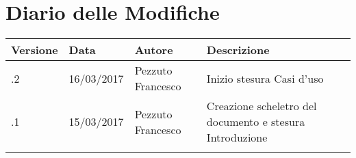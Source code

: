 \section*{Diario delle Modifiche}
\begin{longtabu} to \textwidth {
	X[4,l,p]
	X[4,l,p]
	X[4,l,p]
	X[8,l,p]}
	\toprule
		 Versione & Data & Autore & Descrizione \\
		\midrule
		\endhead
		
		\addlinespace[0.2em]
		\midrule
		.2 & 16/03/2017 & Pezzuto Francesco & Inizio stesura Casi d'uso\\
		\addlinespace[0.2em]
		\midrule
		.1 & 15/03/2017 & Pezzuto Francesco & Creazione scheletro del documento e stesura
		Introduzione\\
		\addlinespace[0.4em]
		
	\bottomrule
\end{longtabu}